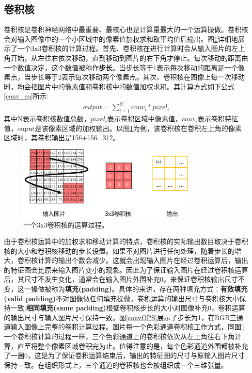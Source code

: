 \subsection{卷积核}
卷积核是卷积神经网络中最重要、最核心也是计算量最大的一个运算操做。卷积核会对输入图像中的一个小区域中的像素值加权求和取平均值后输出。图\ref{convOne}详细地展示了一个3x3卷积核的计算过程。首先、卷积核在进行计算时会从输入图片的左上角开始，从左往右依次移动，直到移动到图片的右下角才停止。每次移动的距离由一个数值决定，这个数值被称作\textbf{步长}。当步长等于1表示每次移动的距离是一个像素点，当步长等于2表示每次移动两个像素点。其次、卷积核在图像上每一次移动时，均会把图片中的像素值和卷积核中的数值加权求和。其计算方式如下公式\ref{conv_eq}所示:
\begin{equation}
\begin{aligned}
\label{conv_eq}
output = \sum_{i=1}^N conv_i*pixel_i
\end{aligned}
\end{equation}
其中N表示卷积核数值总数，$pixel_i$表示卷积区域中像素值，$conv_i$表示卷积特征值，ouput是该像素区域的加权输出。以图\ref{convOne}为例，该卷积核在卷积左上角的像素区域时，其卷积输出是156+156=312。
\begin{figure}[ht]
	\centering
	\includegraphics[width=0.8\textwidth]{figures/convOne.png}
	\caption{一个3x3卷积核的运算过程。}
	\label{convOne}
\end{figure}

由于卷积核运算中的加权求和移动计算的特点，卷积核的实际输出数目取决于卷积核的大小和卷积核移动的步长设置。如果不对图片进行任何处理，随着步长的增大，卷积核计算的输出个数会减少。这就会出现输入图片在经过卷积运算后，输出的特征图会比原来输入图片变小的现象。因此为了保证输入图片在经过卷积核运算后，其尺寸不发生变化，通常会在输入图片外围补充0，来保证卷积核输出尺寸不变，这一操做被称为\textbf{填充(padding)}。具体的来讲，存在两种填充方式：\textbf{有效填充(valid padding)}不对图像做任何填充操做，卷积运算的输出尺寸与卷积核大小保持一致;\textbf{相同填充(same padding)}根据卷积核步长的大小对图像补充0，卷积运算的输出尺寸与输入图片尺寸保持一致。图\ref{convOPS}展示了步长为1，在RGB三通道输入图像上完整的卷积计算过程。图片每一个色彩通道卷积核工作方式，同图\ref{convOne}一个卷积核计算的过程一样，三个色彩通道上的卷积核依次从左上角往右下角计算，直至将整个像素区域卷积完为止。值得注意的是，每个色彩通道外围都被补充了一圈0，这是为了保证卷积运算结束后，输出的特征图的尺寸与原输入图片尺寸保持一致。在组织形式上，三个通道的卷积核也会被组织成一个三维张量。

